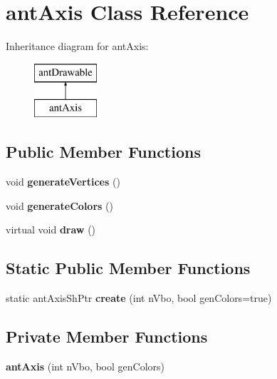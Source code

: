 \hypertarget{classant_axis}{\section{ant\+Axis Class Reference}
\label{classant_axis}
}
Inheritance diagram for ant\+Axis\+:\begin{figure}[H]
\begin{center}
\leavevmode
\includegraphics[height=2.000000cm]{classant_axis}
\end{center}
\end{figure}
\subsection*{Public Member Functions}
\begin{DoxyCompactItemize}
\item 
\hypertarget{classant_axis_ae50457cceb0427172e8036de339bc691}{void {\bfseries generate\+Vertices} ()}\label{classant_axis_ae50457cceb0427172e8036de339bc691}

\item 
\hypertarget{classant_axis_af82e81b2124b97373ecb5d9024ef1de0}{void {\bfseries generate\+Colors} ()}\label{classant_axis_af82e81b2124b97373ecb5d9024ef1de0}

\item 
\hypertarget{classant_axis_ae39f8df539511a5a0b06b5c81248ae2b}{virtual void {\bfseries draw} ()}\label{classant_axis_ae39f8df539511a5a0b06b5c81248ae2b}

\end{DoxyCompactItemize}
\subsection*{Static Public Member Functions}
\begin{DoxyCompactItemize}
\item 
\hypertarget{classant_axis_a372aa34f55e4b0050ff1a939087264ac}{static ant\+Axis\+Sh\+Ptr {\bfseries create} (int n\+Vbo, bool gen\+Colors=true)}\label{classant_axis_a372aa34f55e4b0050ff1a939087264ac}

\end{DoxyCompactItemize}
\subsection*{Private Member Functions}
\begin{DoxyCompactItemize}
\item 
\hypertarget{classant_axis_ad807544c38e19628d29eb336d61c417c}{{\bfseries ant\+Axis} (int n\+Vbo, bool gen\+Colors)}\label{classant_axis_ad807544c38e19628d29eb336d61c417c}

\end{DoxyCompactItemize}

